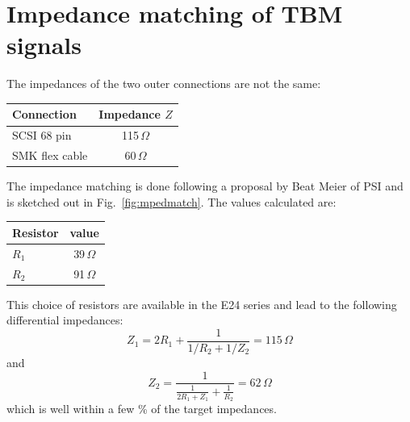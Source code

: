 \section{Impedance matching of TBM signals}

The impedances of the two outer connections are not the same:
\begin{center}
\begin{tabular}{lc}
    \toprule %
    Connection & Impedance $Z$ \\
    \midrule %
    SCSI 68 pin & 115\,$\Omega$ \\
    SMK flex cable & 60\,$\Omega$ \\
    \bottomrule %
\end{tabular}
\end{center}

The impedance matching is done following a proposal by Beat Meier of PSI and is sketched out in Fig.~\ref{fig:mpedmatch}. The values calculated are:
\begin{center}
\begin{tabular}{lc}
    \toprule %
    Resistor & value \\
    \midrule %
    $R_1$ & 39\,$\Omega$ \\
    $R_2$ & 91\,$\Omega$ \\
    \bottomrule %
\end{tabular}
\end{center}
This choice of resistors are available in the E24 series and lead to the following differential impedances:
\begin{equation}
Z_1 = 2R_1 + \frac{1}{1/R_2 + 1/Z_2} = 115\,\Omega
\end{equation}
and
\begin{equation}
Z_2 = \frac{1}{\frac{1}{2R_1+Z_1}+\frac{1}{R_2}} = 62\,\Omega
\end{equation}
which is well within a few \% of the target impedances.

